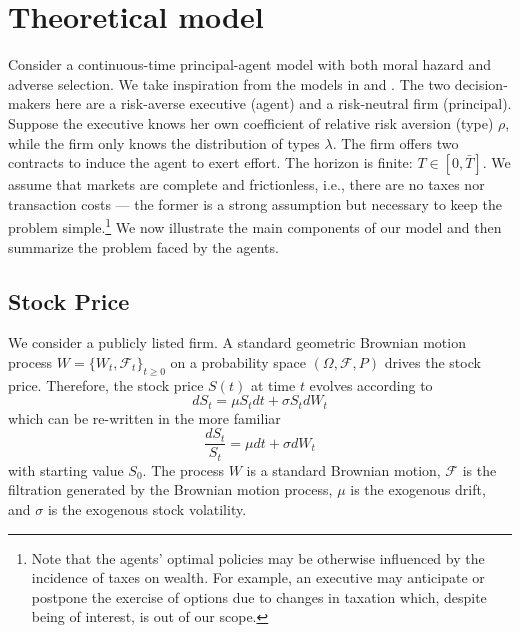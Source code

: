\section{Theoretical model}

Consider a continuous-time principal-agent model with both moral hazard and adverse selection. We take inspiration from the models in \cite{sannikov2008continuous} and \cite{cadenillas2002executive}. The two decision-makers here are a risk-averse executive (agent) and a risk-neutral firm (principal). Suppose the executive knows her own coefficient of relative risk aversion (type) $\rho$, while the firm only knows the distribution of types $\lambda$. The firm offers two contracts to induce the agent to exert effort. The horizon is finite: $T \in [0, \bar{T}]$. We assume that markets are complete and frictionless, i.e., there are no taxes nor transaction costs --- the former is a strong assumption but necessary to keep the problem simple.\footnote{Note that the agents' optimal policies may be otherwise influenced by the incidence of taxes on wealth. For example, an executive may anticipate or postpone the exercise of options due to changes in taxation which, despite being of interest, is out of our scope.}
We now illustrate the main components of our model and then summarize the problem faced by the agents.


\subsection{Stock Price}
We consider a publicly listed firm. A standard geometric Brownian motion process $W = \{ W_t, \mathscr{F}_t \}_{t \ge 0}$ on a probability space $(\Omega, \mathscr{F}, P)$ drives the stock price. 
Therefore, the stock price $S(t)$ at time $t$ evolves according to 
$$ dS_t = \mu S_t dt + \sigma S_t dW_t $$
which can be re-written in the more familiar
$$ \frac{dS_t}{S_t} = \mu dt + \sigma dW_t $$
with starting value $S_0$. The process $W$ is a standard Brownian motion, $\mathscr{F}$ is the filtration generated by the Brownian motion process, $\mu$ is the exogenous drift, and $\sigma$ is the exogenous stock volatility. 


